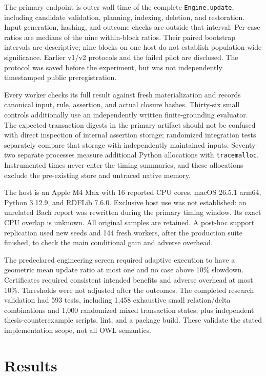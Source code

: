 \documentclass{article}
\newcommand{\code}[1]{\texttt{#1}}
\begin{document}
The primary endpoint is outer wall time of the complete \code{Engine.update},
including candidate validation, planning, indexing, deletion, and restoration.
Input generation, hashing, and outcome checks are outside that interval.
Per-case ratios are medians of the nine within-block ratios. Their paired
bootstrap intervals are descriptive; nine blocks on one host do not establish
population-wide significance. Earlier v1/v2 protocols and the failed pilot
are disclosed. The protocol was saved before the experiment, but was not
independently timestamped public preregistration.

Every worker checks its full result against fresh materialization and records
canonical input, rule, assertion, and actual closure hashes. Thirty-six small
controls additionally use an independently written finite-grounding evaluator.
The expected transaction digests in the primary artifact should not be confused
with direct inspection of internal assertion storage; randomized integration
tests separately compare that storage with independently maintained inputs.
Seventy-two separate processes measure additional Python allocations with
\code{tracemalloc}. Instrumented times never enter the timing summaries, and
these allocations exclude the pre-existing store and untraced native memory.

The host is an Apple M4 Max with 16 reported CPU cores, macOS 26.5.1 arm64,
Python 3.12.9, and RDFLib 7.6.0. Exclusive host use was not established: an
unrelated Bach report was rewritten during the primary timing window. Its
exact CPU overlap is unknown. All original samples are retained. A post-hoc
support replication used new seeds and 144 fresh workers, after the production
suite finished, to check the main conditional gain and adverse overhead.

The predeclared engineering screen required adaptive execution to have a
geometric mean update ratio at most one and no case above 10\% slowdown.
Certificates required consistent intended benefits and adverse overhead at most
10\%. Thresholds were not adjusted after the outcomes. The completed research
validation had 593 tests, including 1,458 exhaustive small relation/delta
combinations and 1,000 randomized mixed transaction states, plus independent
thesis-counterexample scripts, lint, and a package build. These validate the
stated implementation scope, not all OWL semantics.

\section{Results}
\end{document}
